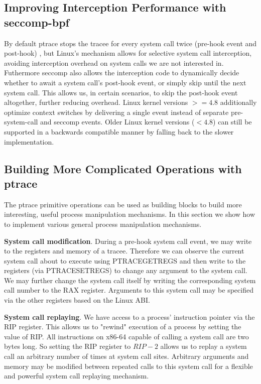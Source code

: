 \subsection{Improving Interception Performance with seccomp-bpf} \label{sec:seccomp}
By default ptrace stops the tracee for every system call twice (pre-hook event and post-hook) , but Linux's  mechanism allows for selective system call interception, avoiding interception overhead on system calls we are not interested in. Futhermore seccomp also allows the interception code to dynamically decide whether to await a system call's post-hook event, or simply skip until the next system call. This allows us, in certain scenarios, to skip the post-hook event altogether, further reducing overhead. Linux kernel versions $>= 4.8$ additionally optimize context switches by delivering a single event instead of separate pre-system-call and seccomp events. Older Linux kernel versions ($< 4.8$) can still be supported in a backwards compatible manner by falling back to the slower implementation.

\subsection{Building More Complicated Operations with ptrace}
The ptrace primitive operations can be used as building blocks to build more interesting, useful process manipulation mechanisms. In this section we show how to implement various general process manipulation mechanisms.

 \textbf{System call modification}. During a pre-hook system call event, we may write to the registers and memory of a tracee. Therefore we can observe the current system call about to execute using PTRACE\textunderscore{}GETREGS and then write to the registers (via PTRACE\textunderscore{}SETREGS) to change any argument to the system call. We may further change the system call itself by writing the corresponding system call number to the RAX register. Arguments to this system call may be specified via the other registers based on the Linux ABI.

 \textbf{System call replaying}.  We have access to a process' instruction pointer via the RIP register. This allows us to "rewind" execution of a
   process by setting the value of RIP. All instructions on x86-64 capable of calling a system call are two bytes long. So setting the RIP register to $RIP - 2$ allows us to replay a system call an arbitrary number of times at system call sites. Arbitrary arguments and memory may be modified between repeated calls to this system call for a flexible and powerful system call replaying mechanism.

